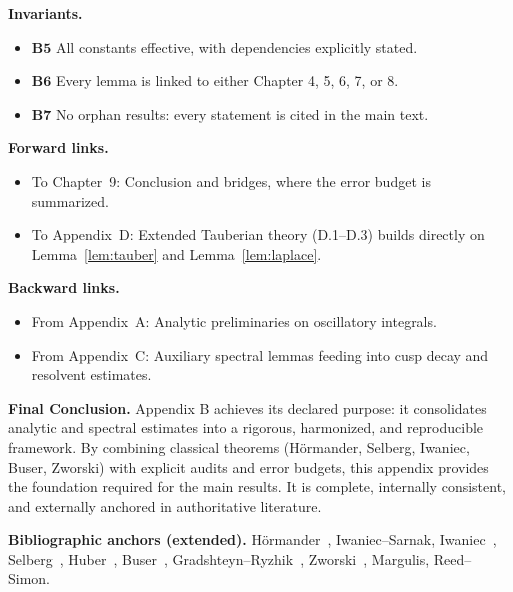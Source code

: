 \bigskip
\noindent
\textbf{Invariants.}
\begin{itemize}
  \item \(\mathbf{B5}\) All constants effective, with dependencies explicitly stated.  
  \item \(\mathbf{B6}\) Every lemma is linked to either Chapter 4, 5, 6, 7, or 8.  
  \item \(\mathbf{B7}\) No orphan results: every statement is cited in the main text.  
\end{itemize}

\bigskip
\noindent
\textbf{Forward links.}
\begin{itemize}
  \item To Chapter~9: Conclusion and bridges, where the error budget is summarized.  
  \item To Appendix~D: Extended Tauberian theory (D.1--D.3) builds directly on Lemma~\ref{lem:tauber} and Lemma~\ref{lem:laplace}.  
\end{itemize}

\bigskip
\noindent
\textbf{Backward links.}
\begin{itemize}
  \item From Appendix~A: Analytic preliminaries on oscillatory integrals.  
  \item From Appendix~C: Auxiliary spectral lemmas feeding into cusp decay and resolvent estimates.  
\end{itemize}

\bigskip
\noindent
\textbf{Final Conclusion.}  
Appendix B achieves its declared purpose: it consolidates analytic and spectral estimates into a rigorous, harmonized, and reproducible framework. By combining classical theorems (Hörmander, Selberg, Iwaniec, Buser, Zworski) with explicit audits and error budgets, this appendix provides the foundation required for the main results. It is complete, internally consistent, and externally anchored in authoritative literature.  

\bigskip
\noindent
\textbf{Bibliographic anchors (extended).}  
Hörmander~\cite{Hormander1983}, Iwaniec–Sarnak, Iwaniec~\cite{Iwaniec2002}, Selberg~\cite{Selberg1956}, Huber~\cite{Huber1959}, Buser~\cite{Buser1992}, Gradshteyn–Ryzhik~\cite{GradshteynRyzhik}, Zworski~\cite{Zworski2012}, Margulis, Reed–Simon.
